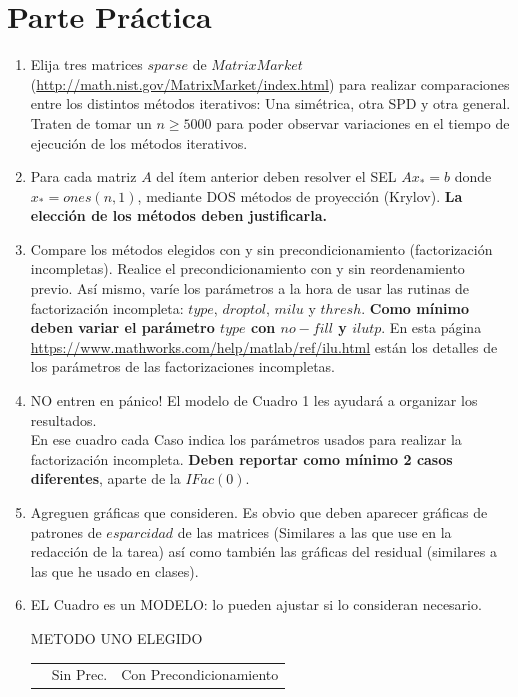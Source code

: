 \documentclass{article}
\begin{document}
\section*{Parte Práctica}
\begin{enumerate}
\item Elija tres matrices $sparse$ de $MatrixMarket$\\
(\url{http://math.nist.gov/MatrixMarket/index.html}) para realizar comparaciones entre los distintos métodos iterativos: Una simétrica, otra SPD y otra general. Traten de tomar un $n\geq 5000$ para poder observar variaciones en el tiempo de ejecución de los métodos iterativos.
\item Para cada matriz $A$ del ítem anterior deben resolver el SEL $Ax_{*}=b$ donde $x_{*} = ones(n,1)$, mediante DOS métodos de proyección (Krylov). {\bf La elección de los métodos deben justificarla.}
\item Compare los métodos elegidos con y sin precondicionamiento (factorización incompletas). Realice el precondicionamiento con y sin reordenamiento previo. Así mismo, varíe los parámetros a la hora de usar las rutinas de factorización incompleta: $type$, $droptol$, $milu$ y $thresh$. {\bf Como mínimo deben variar el parámetro $type$ con $no-fill$ y $ilutp$}. En esta página \url{https://www.mathworks.com/help/matlab/ref/ilu.html} están los detalles de los parámetros de las factorizaciones incompletas.
\item NO entren en pánico! El modelo de Cuadro 1 les ayudará a organizar los resultados.\\
En ese cuadro cada Caso indica los parámetros usados para realizar la factorización incompleta. {\bf Deben reportar como mínimo 2 casos diferentes}, aparte de la $IFac(0)$.
\item Agreguen gráficas que consideren. Es obvio que deben aparecer gráficas de patrones de $esparcidad$ de las matrices (Similares a las que use en la redacción de la tarea) así como también las gráficas del residual (similares a las que he usado en clases).
\item EL Cuadro es un MODELO: lo pueden ajustar si lo consideran necesario.
\begin{table}[H]

\centering
METODO UNO ELEGIDO
\begin{tabular}{|c||c||c|c|c||c|c|c|}
\hline
& \multirow{2}{*}{Sin  Prec.} &

\multicolumn{6}{|c|}{Con Precondicionamiento} \\


\end{tabular}
\end{table}
\end{enumerate}
\end{document}
